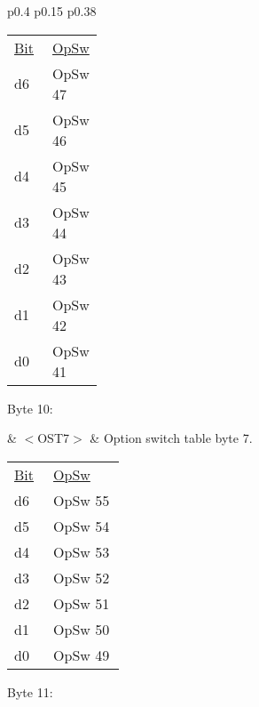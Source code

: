 \begin{tabular}{p{0.4\linewidth} p{0.15\linewidth} p{0.38\linewidth}} 

\begin{tabular}{|p{0.3cm}|p{0.3cm}|p{0.3cm}|p{0.3cm}|p{0.3cm}|p{0.3cm}|p{0.3cm}|p{0.3cm}|}
\hline
0 & d6 & d5 & d4 & d3 & d2 & d1 & d0\\
\hline
\end{tabular}
& $<$OST6$>$ & Option switch table byte 6.\\
\end{tabular}

\begin{tabular}{p{0.05\linewidth} p{0.2\linewidth} } 
\underline{Bit} & \underline{OpSw} \\
d6 & OpSw 47\\
d5 & OpSw 46\\
d4 & OpSw 45\\
d3 & OpSw 44\\
d2 & OpSw 43\\
d1 & OpSw 42\\
d0 & OpSw 41\\
\end{tabular}

Byte 10:

& $<$OST7$>$ & Option switch table byte 7.\\
\end{tabular}

\begin{tabular}{p{0.05\linewidth} p{0.2\linewidth} } 
\underline{Bit} & \underline{OpSw} \\
d6 & OpSw 55\\
d5 & OpSw 54\\
d4 & OpSw 53\\
d3 & OpSw 52\\
d2 & OpSw 51\\
d1 & OpSw 50\\
d0 & OpSw 49\\
\end{tabular}

Byte 11:

